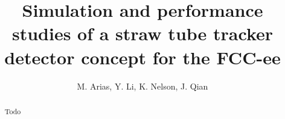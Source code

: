 \documentclass{cernrep}
\begin{document}
\title{Simulation and performance studies of a straw tube tracker detector concept for the FCC-ee}
\author{M. Arias, Y. Li, K. Nelson, J. Qian}


\begin{abstract}
Todo
\end{abstract}


\maketitle
\end{document}
